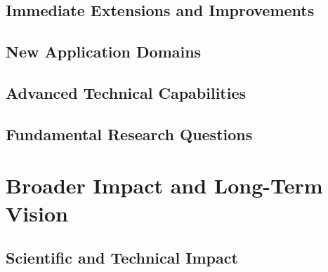 \subsection{Immediate Extensions and Improvements}

\subsection{New Application Domains}

\subsection{Advanced Technical Capabilities}

\subsection{Fundamental Research Questions}

\section{Broader Impact and Long-Term Vision}

\subsection{Scientific and Technical Impact}

